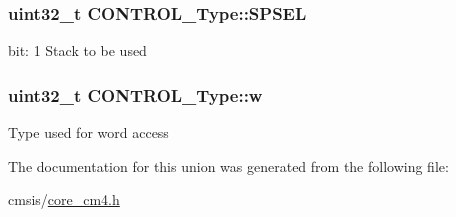 \subsubsection[{\texorpdfstring{S\+P\+S\+EL}{SPSEL}}]{\setlength{\rightskip}{0pt plus 5cm}uint32\+\_\+t C\+O\+N\+T\+R\+O\+L\+\_\+\+Type\+::\+S\+P\+S\+EL}\hypertarget{union_c_o_n_t_r_o_l___type_a8cc085fea1c50a8bd9adea63931ee8e2}{}\label{union_c_o_n_t_r_o_l___type_a8cc085fea1c50a8bd9adea63931ee8e2}
bit\+: 1 Stack to be used 
\subsubsection[{\texorpdfstring{w}{w}}]{\setlength{\rightskip}{0pt plus 5cm}uint32\+\_\+t C\+O\+N\+T\+R\+O\+L\+\_\+\+Type\+::w}\hypertarget{union_c_o_n_t_r_o_l___type_a6b642cca3d96da660b1198c133ca2a1f}{}\label{union_c_o_n_t_r_o_l___type_a6b642cca3d96da660b1198c133ca2a1f}
Type used for word access 

The documentation for this union was generated from the following file\+:\begin{DoxyCompactItemize}
\item 
cmsis/\hyperlink{core__cm4_8h}{core\+\_\+cm4.\+h}\end{DoxyCompactItemize}
